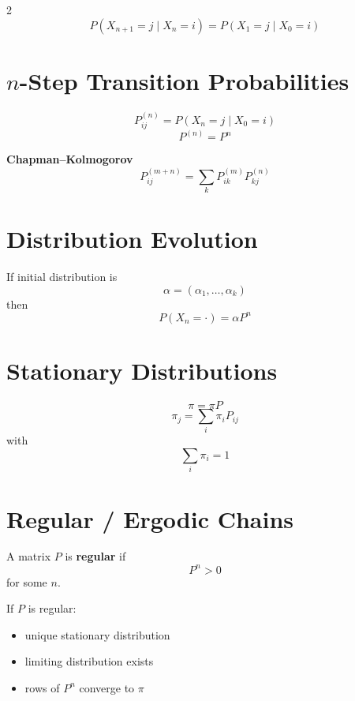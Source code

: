 \documentclass[10pt]{article}
\begin{document}
\begin{multicols}{2}
\[
P(X_{n+1}=j \mid X_n=i)=P(X_1=j \mid X_0=i)
\]

\section{\(n\)-Step Transition Probabilities}

\begin{formulabox}
\[
P_{ij}^{(n)} = P(X_n=j \mid X_0=i)
\]
\[
P^{(n)} = P^n
\]
\end{formulabox}

\begin{theorembox}
\textbf{Chapman--Kolmogorov}
\[
P_{ij}^{(m+n)}
=
\sum_k P_{ik}^{(m)}P_{kj}^{(n)}
\]
\end{theorembox}

\section{Distribution Evolution}

\begin{formulabox}
If initial distribution is
\[
\alpha = (\alpha_1,\dots,\alpha_k)
\]
then
\[
P(X_n=\cdot)=\alpha P^n
\]
\end{formulabox}

\section{Stationary Distributions}

\begin{definitionbox}
\[
\pi=\pi P
\]
\[
\pi_j=\sum_i \pi_i P_{ij}
\]
with
\[
\sum_i \pi_i=1
\]
\end{definitionbox}

\section{Regular / Ergodic Chains}

\begin{definitionbox}
A matrix \(P\) is \textbf{regular} if
\[
P^n>0
\]
for some \(n\).
\end{definitionbox}

\begin{theorembox}
If \(P\) is regular:
\begin{itemize}[leftmargin=12pt,itemsep=1pt]
\item unique stationary distribution
\item limiting distribution exists
\item rows of \(P^n\) converge to \(\pi\)
\end{itemize}
\end{theorembox}


\end{multicols}
\end{document}
